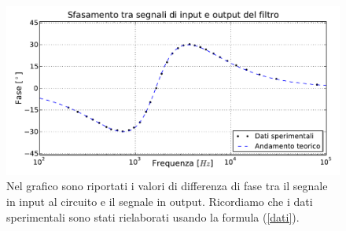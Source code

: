 \begin{figure}[H]%
	\centering
	\includegraphics[width=150mm]{i_peli.pdf}
		\caption{Nel grafico sono riportati i valori di differenza di fase tra il segnale in input al circuito e il segnale in output. Ricordiamo che i dati sperimentali sono stati rielaborati usando la formula (\ref{dati}).}
	\label{fig:pahser}
\end{figure}